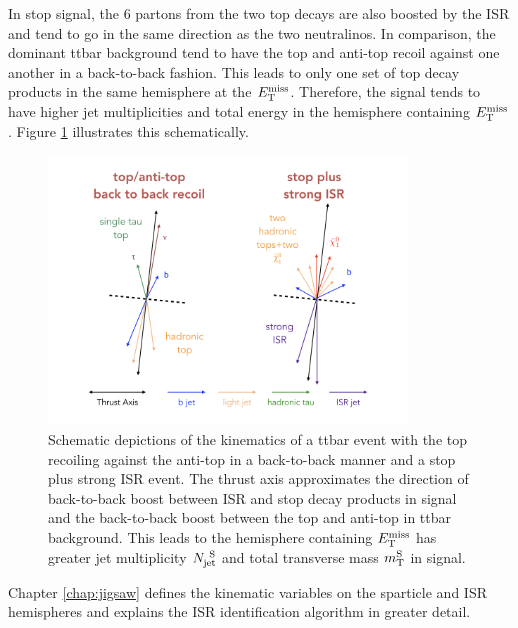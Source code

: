 \indent In stop signal, the 6 partons from the two top decays are also boosted by the ISR and tend to go in the same direction as the two neutralinos.  In comparison, the dominant ttbar background tend to have the top and anti-top recoil against one another in a back-to-back fashion.  This leads to only one set of top decay products in the same hemisphere at the $E_{\mathrm{T}}^{\mathrm{miss}}$.  Therefore, the signal tends to have higher jet multiplicities and total energy in the hemisphere containing $E_{\mathrm{T}}^{\mathrm{miss}}$.  Figure \ref{fig:ISR:ttbarb2b_sig} illustrates this schematically.  \\

\begin{figure}[h!]
  \centering
	\includegraphics[width=0.85\textwidth]{./figures/strategy/ttbarb2b_stop.png}
	\caption[Schematic depictions of the kinematics of a ttbar event with the top recoiling against the anti-top in a back-to-back manner and a stop plus strong ISR event]{Schematic depictions of the kinematics of a ttbar event with the top recoiling against the anti-top in a back-to-back manner and a stop plus strong ISR event.  The thrust axis approximates the direction of back-to-back boost between ISR and stop decay products in signal and the back-to-back boost between the top and anti-top in ttbar background.  This leads to the hemisphere containing $E_{\mathrm{T}}^{\mathrm{miss}}$ has greater jet multiplicity $N_{\mathrm{jet}}^{~\mathrm{S}}$ and total transverse mass $m_{\mathrm{T}}^{\mathrm{S}}$ in signal. }
	\label{fig:ISR:ttbarb2b_sig}
\end{figure}

\indent Chapter \ref{chap:jigsaw} defines the kinematic variables on the sparticle and ISR hemispheres and explains the ISR identification algorithm in greater detail. \\


